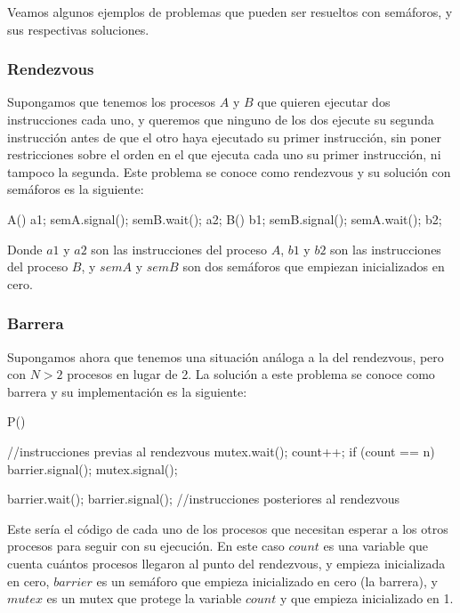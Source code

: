 \documentclass{article}
\begin{document}
Veamos algunos ejemplos de problemas que pueden ser resueltos con sem\'aforos, y sus respectivas soluciones.

\subsubsection{Rendezvous}

Supongamos que tenemos los procesos $A$ y $B$ que quieren ejecutar dos instrucciones cada uno, y queremos que ninguno de los dos ejecute su segunda instrucci\'on antes de que el otro haya ejecutado su primer instrucci\'on, sin poner restricciones sobre el orden en el que ejecuta cada uno su primer instrucci\'on, ni tampoco la segunda. Este problema se conoce como rendezvous y su soluci\'on con sem\'aforos es la siguiente:

\begin{code}
A()
{
    a1;
		semA.signal();
		semB.wait();
		a2;
}
B()
{
    b1;
		semB.signal();
		semA.wait();
		b2;
}
\end{code}

Donde $a1$ y $a2$ son las instrucciones del proceso $A$, $b1$ y $b2$ son las instrucciones del proceso $B$, y $semA$ y $semB$ son dos sem\'aforos que empiezan inicializados en cero.

\subsubsection{Barrera}

Supongamos ahora que tenemos una situaci\'on an\'aloga a la del rendezvous, pero con $N > 2$ procesos en lugar de 2. La soluci\'on a este problema se conoce como barrera y su implementaci\'on es la siguiente:

\begin{code}
P()
{
    //instrucciones previas al rendezvous
    mutex.wait();
    count++;
    if (count == n)
        barrier.signal();
    mutex.signal();
    
    barrier.wait();
    barrier.signal();
    //instrucciones posteriores al rendezvous
}
\end{code}

Este ser\'ia el c\'odigo de cada uno de los procesos que necesitan esperar a los otros procesos para seguir con su ejecuci\'on. En este caso $count$ es una variable que cuenta cu\'antos procesos llegaron al punto del rendezvous, y empieza inicializada en cero, $barrier$ es un sem\'aforo que empieza inicializado en cero (la barrera), y $mutex$ es un mutex que protege la variable $count$ y que empieza inicializado en 1.
\end{document}
